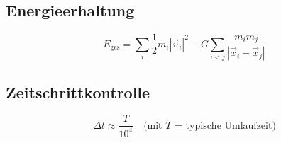 \subsection{Energieerhaltung}
\begin{equation}
E_{\text{ges}} = \sum_i \frac{1}{2} m_i |\vec{v}_i|^2 - G \sum_{i < j} \frac{m_i m_j}{|\vec{x}_i - \vec{x}_j|}
\end{equation}

\subsection{Zeitschrittkontrolle}
\begin{equation}
\Delta t \approx \frac{T}{10^4} \quad \text{(mit $T$ = typische Umlaufzeit)}
\end{equation}